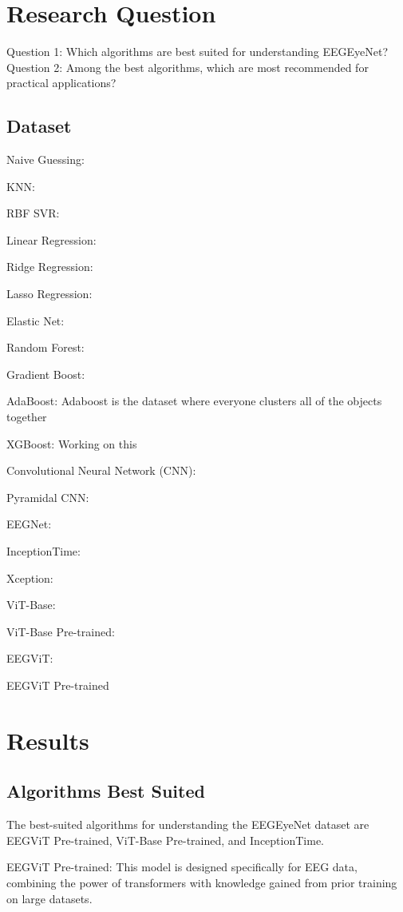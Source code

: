 \documentclass{article}
\begin{document}
\section{Research Question}
Question 1: Which algorithms are best suited for understanding EEGEyeNet?
Question 2: Among the best algorithms, which are most recommended for practical applications?


\subsection{Dataset}


Naive Guessing: 


KNN: 


RBF SVR: 


Linear Regression: 


Ridge Regression: 


Lasso Regression: 


Elastic Net: 


Random Forest:  


Gradient Boost: 

AdaBoost: 
Adaboost is the dataset where everyone clusters all of the objects together

XGBoost: 
Working on this 


Convolutional Neural Network (CNN): 


Pyramidal CNN: 

EEGNet: 



InceptionTime: 


Xception:

ViT-Base: 

ViT-Base Pre-trained: 

EEGViT: 

EEGViT Pre-trained


\section {Results}



\subsection{Algorithms Best Suited}
The best-suited algorithms for understanding the EEGEyeNet dataset are EEGViT Pre-trained, ViT-Base Pre-trained, and InceptionTime.


EEGViT Pre-trained: This model is designed specifically for EEG data, combining the power of transformers with knowledge gained from prior training on large datasets. 
\end{document}
